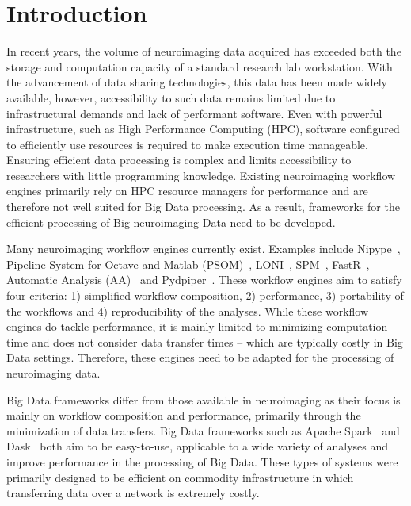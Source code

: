 \chapter{Introduction}

        In recent years, the volume of neuroimaging data acquired has exceeded
        both the storage and computation capacity of a standard research 
        lab workstation. With the advancement of data sharing technologies, 
        this data has been made widely available, however, accessibility to 
        such data remains limited due to infrastructural demands and lack of 
        performant software. Even with powerful infrastructure, such as High
        Performance Computing (HPC), software configured to 
        efficiently use resources is required to make execution time manageable. 
        Ensuring efficient data processing is 
        complex and limits accessibility to researchers with little programming 
        knowledge. Existing neuroimaging workflow engines primarily rely on HPC
        resource managers for performance and are therefore not well suited for
        Big Data processing. As a result, frameworks for the efficient 
        processing of Big neuroimaging Data need to be developed.
        
        Many neuroimaging workflow engines currently exist. Examples include
        Nipype~\cite{nipype}, Pipeline System for Octave and Matlab 
        (PSOM)~\cite{10.3389/fninf.2012.00007}, LONI~\cite{REX20031033}, 
        SPM~\cite{spm}, FastR~\cite{10.3389/fict.2016.00015},
        Automatic Analysis (AA)~\cite{10.3389/fninf.2014.00090} and 
        Pydpiper~\cite{10.3389/fninf.2014.00067}. These 
        workflow engines aim to satisfy four criteria: 1) simplified
        workflow composition, 2) performance, 3) portability of the workflows 
        and 4) reproducibility of the analyses. While these workflow engines
        do tackle performance, it is mainly limited to minimizing computation
        time and does not consider data transfer times -- which are typically
        costly in Big Data settings. Therefore, these engines need to be adapted
        for the processing of neuroimaging data.

        Big Data frameworks differ from those available in neuroimaging as their
        focus is mainly on workflow composition and performance, primarily
        through the minimization of data transfers. Big Data frameworks such as
        Apache Spark~\cite{Zaharia:2016:ASU:3013530.2934664} and
        Dask~\cite{rocklin2015dask} both aim to be easy-to-use, applicable to a
        wide variety of analyses and improve performance in the processing of
        Big Data. These types of systems were primarily designed to be efficient
        on commodity infrastructure in which transferring data over a network is
        extremely costly.

